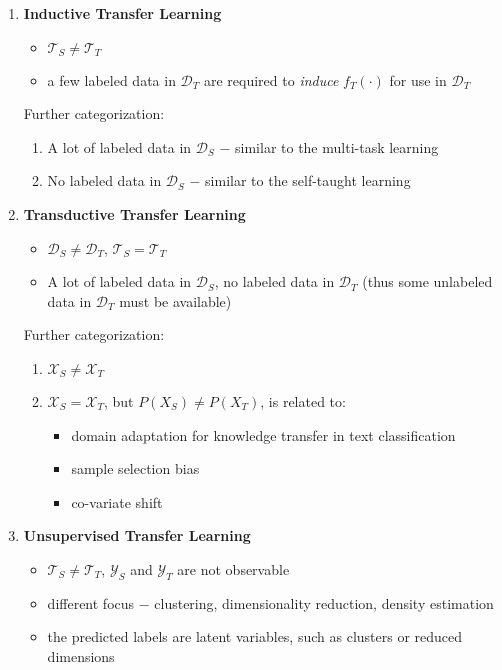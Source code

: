 \documentclass[a4paper,twocolumn]{article}
\newcommand{\D}{\mathcal{D}}
\newcommand{\T}{\mathcal{T}}
\newcommand{\X}{\mathcal{X}}
\newcommand{\Y}{\mathcal{Y}}
\begin{document}
\begin{enumerate}
    \item \textbf{Inductive Transfer Learning}
        \begin{itemize}
            \item $\T_S \ne \T_T$
            \item a few labeled data in $\D_T$ are required to \textit{induce} $f_T(\cdot)$ for use in $\D_T$
        \end{itemize}
        Further categorization:
        \begin{enumerate}
            \item A lot of labeled data in $\D_S$ $-$ similar to the multi-task learning
            \item No labeled data in $\D_S$ $-$ similar to the self-taught learning
        \end{enumerate}
    \item \textbf{Transductive Transfer Learning}
        \begin{itemize}
            \item $\D_S \ne \D_T$, $\T_S = \T_T$
            \item A lot of labeled data in $\D_S$, no labeled data in $\D_T$ (thus some unlabeled data in $\D_T$ must be available)
        \end{itemize}
        Further categorization:
        \begin{enumerate}
            \item $\X_S \ne \X_T$
            \item $\X_S = \X_T$, but $P(X_S) \ne P(X_T)$, is related to:
                \begin{itemize}
                    \item domain adaptation for knowledge transfer in text classification
                    \item sample selection bias
                    \item co-variate shift
                \end{itemize}
        \end{enumerate}
    \item \textbf{Unsupervised Transfer Learning}
        \begin{itemize}
            \item $\T_S \ne \T_T$, $\Y_S$ and $\Y_T$ are not observable
            \item different focus $-$ clustering, dimensionality reduction, density estimation
            \item the predicted labels are latent variables, such as clusters or reduced dimensions
        \end{itemize}
\end{enumerate}
\end{document}
